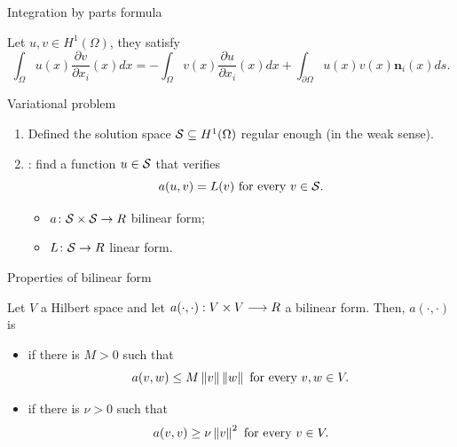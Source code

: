 \begin{frame}{Integration by parts formula}
	\begin{theorem}
		
		Let $u, v\in H^1(\Omega)$, they satisfy
		\begin{equation*}
		\label{formula_int_por_partes}
		\int_\Omega u(x)\frac{\partial v}{\partial x_i}(x)dx=-\int_\Omega v(x)\frac{\partial u}{\partial x_i}(x)dx+\int_{\partial \Omega}u(x)v(x)\mathbf{n}_i(x)ds.
		\end{equation*}
		
	\end{theorem}
	
\end{frame}

\begin{frame}{Variational problem}

\begin{enumerate}
	\item Defined the solution space $\S\subseteq H^1(\Omega)$  regular enough (in the weak sense).
	\item {}: find a function $u\in \S$ that verifies $$a(u,v)=L(v)\text{ for every }v\in \S.$$
		\begin{itemize}\itemsep1em
			\item $a\colon\S\times\S\to\R$ bilinear form; 
			\item $L\colon\S\to\R$ linear form.
		\end{itemize}
\end{enumerate}

\end{frame}

\begin{frame}{Properties of bilinear form}
	\begin{definicion}
		Let $V$ a Hilbert space and let $a(\cdot,\cdot):V\times V\longrightarrow\R$ a bilinear form. Then, $a(\cdot,\cdot)$ is
		\begin{itemize}
			\item {} if there is $M>0$ such that $$a(v,w)\le M\norma{v}\norma{w}\text{ for every } v,w\in V.$$
			\item {} if there is $\nu>0$ such that $$a(v,v)\geq\nu\norma{v}^2\text{ for every } v\in V.$$
		\end{itemize}
	\end{definicion}
\end{frame}

